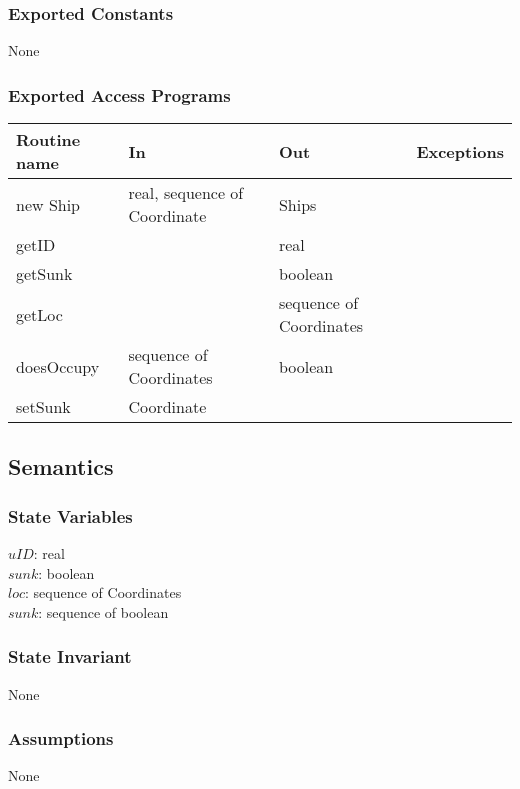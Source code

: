 \documentclass[12pt,fleqn]{article}
\begin{document}
    \subsubsection* {Exported Constants}
    None

    \subsubsection* {Exported Access Programs}

    \begin{tabular}{| l | l | l | l |}
    \hline
    \textbf{Routine name} & \textbf{In} & \textbf{Out} & \textbf{Exceptions}\\
    \hline
    new Ship & real, sequence of Coordinate & Ships & ~\\
    \hline
    getID & ~ & real & ~\\
    \hline
    getSunk & ~ & boolean & ~\\
    \hline
    getLoc & ~ & sequence of Coordinates & ~\\
    \hline
    doesOccupy & sequence of Coordinates & boolean & ~\\
    \hline
    setSunk & Coordinate & ~ & ~\\    
    \hline

    \hline

    \end{tabular}

    \subsection* {Semantics}

    \subsubsection* {State Variables}
    $uID$: real \\
    $sunk$: boolean \\
    $loc$: sequence of Coordinates \\
    $sunk$: sequence of boolean

    \subsubsection* {State Invariant}
    None

    \subsubsection* {Assumptions}
    None
\end{document}
